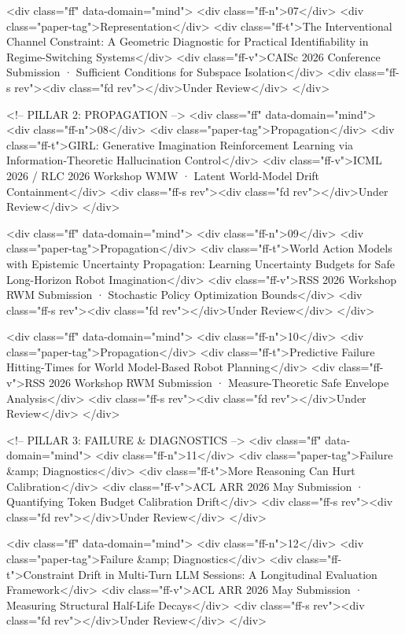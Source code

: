       <div class="ff" data-domain="mind">
        <div class="ff-n">07</div>
        <div class="paper-tag">Representation</div>
        <div class="ff-t">The Interventional Channel Constraint: A Geometric Diagnostic for Practical Identifiability in Regime-Switching Systems</div>
        <div class="ff-v">CAISc 2026 Conference Submission · Sufficient Conditions for Subspace Isolation</div>
        <div class="ff-s rev"><div class="fd rev"></div>Under Review</div>
      </div>

      <!-- PILLAR 2: PROPAGATION -->
      <div class="ff" data-domain="mind">
        <div class="ff-n">08</div>
        <div class="paper-tag">Propagation</div>
        <div class="ff-t">GIRL: Generative Imagination Reinforcement Learning via Information-Theoretic Hallucination Control</div>
        <div class="ff-v">ICML 2026 / RLC 2026 Workshop WMW · Latent World-Model Drift Containment</div>
        <div class="ff-s rev"><div class="fd rev"></div>Under Review</div>
      </div>

      <div class="ff" data-domain="mind">
        <div class="ff-n">09</div>
        <div class="paper-tag">Propagation</div>
        <div class="ff-t">World Action Models with Epistemic Uncertainty Propagation: Learning Uncertainty Budgets for Safe Long-Horizon Robot Imagination</div>
        <div class="ff-v">RSS 2026 Workshop RWM Submission · Stochastic Policy Optimization Bounds</div>
        <div class="ff-s rev"><div class="fd rev"></div>Under Review</div>
      </div>

      <div class="ff" data-domain="mind">
        <div class="ff-n">10</div>
        <div class="paper-tag">Propagation</div>
        <div class="ff-t">Predictive Failure Hitting-Times for World Model-Based Robot Planning</div>
        <div class="ff-v">RSS 2026 Workshop RWM Submission · Measure-Theoretic Safe Envelope Analysis</div>
        <div class="ff-s rev"><div class="fd rev"></div>Under Review</div>
      </div>

      <!-- PILLAR 3: FAILURE & DIAGNOSTICS -->
      <div class="ff" data-domain="mind">
        <div class="ff-n">11</div>
        <div class="paper-tag">Failure &amp; Diagnostics</div>
        <div class="ff-t">More Reasoning Can Hurt Calibration</div>
        <div class="ff-v">ACL ARR 2026 May Submission · Quantifying Token Budget Calibration Drift</div>
        <div class="ff-s rev"><div class="fd rev"></div>Under Review</div>
      </div>

      <div class="ff" data-domain="mind">
        <div class="ff-n">12</div>
        <div class="paper-tag">Failure &amp; Diagnostics</div>
        <div class="ff-t">Constraint Drift in Multi-Turn LLM Sessions: A Longitudinal Evaluation Framework</div>
        <div class="ff-v">ACL ARR 2026 May Submission · Measuring Structural Half-Life Decays</div>
        <div class="ff-s rev"><div class="fd rev"></div>Under Review</div>
      </div>

